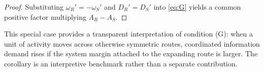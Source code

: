 \begin{proof}
Substituting $\omega_R'=-\omega_S'$ and $D_R'=D_S'$ into \eqref{eq:G} yields a common positive factor multiplying $A_R-A_S$.
\end{proof}

This special case provides a transparent interpretation of condition (G): when a unit of activity moves across otherwise symmetric routes, coordinated information demand rises if the system margin attached to the expanding route is larger. The corollary is an interpretive benchmark rather than a separate contribution.
